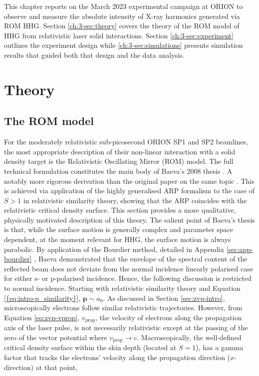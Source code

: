 This chapter reports on the March 2023 experimental campaign at ORION to observe and measure the absolute intensity of X-ray harmonics generated via ROM HHG. Section \ref{ch:3-sec:theory} covers the theory of the ROM model of HHG from relativistic laser solid interactions. Section \ref{ch:3-sec:experiment} outlines the experiment design while \ref{ch:3-sec:simulations} presents simulation results that guided both that design and the data analysis. 

\section{\label{ch:3-sec:theory}Theory}
\subsection{The ROM model}
For the moderately relativistic sub-picosecond ORION SP1 and SP2 beamlines, the most appropriate description of their non-linear interaction with a solid density target is the Relativistic Oscillating Mirror (ROM) model. The full technical formulation constitutes the main body of Baeva's 2008 thesis \cite{baevaHighHarmonicGeneration2008}. A notably more rigorous derivation than the original paper on the same topic \cite{baevaTheoryHighorderHarmonic2006}. This is achieved via application of the highly generalised \ac{ARP} formalism to the case of $S>1$ in relativistic similarity theory, showing that the \ac{ARP} coincides with the relativistic critical density surface. This section provides a more qualitative, physically motivated description of this theory. The salient point of Baeva's thesis is that, while the surface motion is generally complex and parameter space dependent, at the moment relevant for HHG, the surface motion is always parabolic. By application of the Bourdier method, detailed in Appendix \ref{sec:app-bourdier} \cite{bourdierObliqueIncidenceStrong1983}, Baeva demonstrated that the envelope of the spectral content of the reflected beam does not deviate from the normal incidence linearly polarised case for either s- or p-polarised incidence. Hence, the following discussion is restricted to normal incidence. Starting with relativistic similarity theory and Equation \ref{{eq:intro-p_similarity}}, $\mathbf{p} \sim a_0$. As discussed in Section \ref{sec:zvp-intro}, microscopically electrons follow similar relativistic trajectories. However, from Equation \ref{eq:zvp-vprop}, $v_\mathrm{prop}$, the velocity of electrons along the propagation axis of the laser pulse, is not necessarily relativistic except at the passing of the zero of the vector potential where $v_\mathrm{prop} \to c$. Macroscopically, the well-defined critical density surface within the skin depth (located at $S =1$), has a gamma factor that tracks the electrons' velocity along the propagation direction ($x$-direction) at that point,
